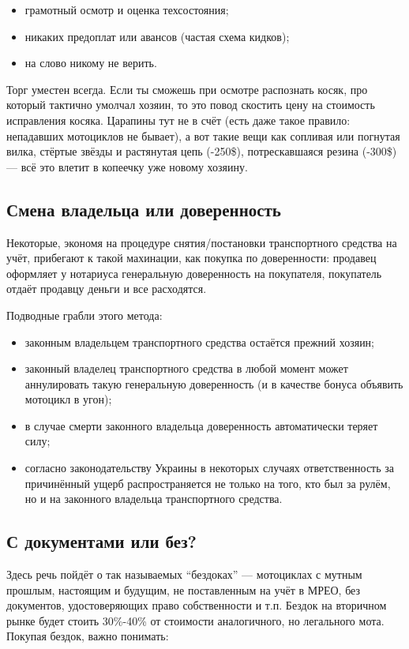 \documentclass[12pt,a4paper]{article}
\begin{document}
\begin{itemize}
\item грамотный осмотр и оценка техсостояния;
\item никаких предоплат или авансов (частая схема кидков);
\item на слово никому не верить.
\end{itemize}

Торг уместен всегда. Если ты сможешь при осмотре распознать косяк,
про который тактично умолчал хозяин, то это повод скостить цену на
стоимость исправления косяка. Царапины тут не в счёт (есть даже такое
правило: непадавших мотоциклов не бывает), а вот такие вещи как сопливая
или погнутая вилка, стёртые звёзды и растянутая цепь (-250\$),
потрескавшаяся резина (-300\$) --- всё это влетит в копеечку уже новому
хозяину.

\subsection{Смена владельца или доверенность}

Некоторые, экономя на процедуре снятия/постановки транспортного
средства на учёт, прибегают к такой махинации, как покупка по
доверенности: продавец оформляет у нотариуса генеральную доверенность
на покупателя, покупатель отдаёт продавцу деньги и все расходятся.

Подводные грабли этого метода:

\begin{itemize}
\item законным владельцем транспортного средства остаётся прежний
хозяин;
\item законный владелец транспортного средства в любой момент может
аннулировать такую генеральную доверенность (и в качестве бонуса
объявить мотоцикл в угон);
\item в случае смерти законного владельца доверенность автоматически
теряет силу;
\item согласно законодательству Украины в некоторых случаях
ответственность за причинённый ущерб распространяется не только на того,
кто был за рулём, но и на законного владельца транспортного средства.
\end{itemize}

\subsection{С документами или без?}

Здесь речь пойдёт о так называемых ``бездоках'' --- мотоциклах с мутным
прошлым, настоящим и будущим, не поставленным на учёт в МРЕО, без
документов, удостоверяющих право собственности и т.п. Бездок на
вторичном рынке будет стоить 30\%-40\% от стоимости аналогичного,
но легального мота. Покупая бездок, важно понимать:
\end{document}
